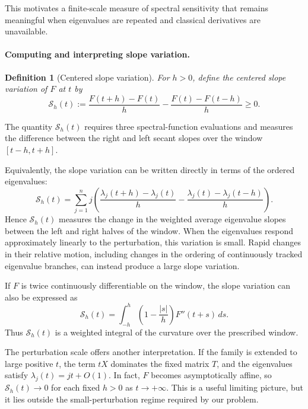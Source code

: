 \documentclass[10pt,a4paper]{article}
\newtheorem{definition}{Definition}[section]
\begin{document}
This motivates a finite-scale measure of spectral
sensitivity that remains meaningful when eigenvalues
are repeated and classical derivatives are unavailable.


\paragraph{Computing and interpreting slope variation.}
\begin{definition}[Centered slope variation]\label{def:defect}
For $h>0$, define the centered slope variation of $F$ at $t$ by
\begin{equation}\label{eq:defect}
\boxed{
\mathcal S_h(t)
:=
\frac{F(t+h)-F(t)}h
-
\frac{F(t)-F(t-h)}h
\geq0.
}
\end{equation}
\end{definition}
The quantity $\mathcal S_h(t)$ requires three
spectral-function evaluations and measures the difference
between the right and left secant slopes over the window
$[t-h,t+h]$.  


Equivalently, the slope variation can be written
directly in terms of the ordered eigenvalues:
\begin{equation}\label{eq:slope-eigenvalues}
\boxed{
\mathcal S_h(t)=\sum_{j=1}^n j
\left(
\frac{\lambda_j(t+h)-\lambda_j(t)}{h}
-\frac{\lambda_j(t)-\lambda_j(t-h)}{h}
\right).
}
\end{equation}
Hence $\mathcal S_h(t)$ measures the change in the
weighted average eigenvalue slopes between the
left and right halves of the window. When the
eigenvalues respond approximately linearly to the
perturbation, this variation is small. Rapid changes
in their relative motion, including changes in the
ordering of continuously tracked eigenvalue branches,
can instead produce a large slope variation.

If $F$ is twice continuously differentiable on the window,
the slope variation can also be expressed as
\begin{equation}\label{eq:slope-curvature}
\boxed{
\mathcal S_h(t)
=
\int_{-h}^{h}
\left(1-\frac{|s|}{h}\right)F''(t+s)\,ds.
}
\end{equation}
Thus $\mathcal S_h(t)$ is a weighted
integral of the curvature over the prescribed window.


The perturbation scale offers another interpretation.
If the family is extended to large positive $t$, the
term $tX$ dominates the fixed matrix $T$, and the
eigenvalues satisfy $\lambda_j(t)=jt+O(1)$.
In fact, $F$ becomes asymptotically affine, so
$\mathcal S_h(t)\to0$ for each fixed $h>0$ as
$t\to+\infty$. This is a useful limiting picture,
but it lies outside the small-perturbation regime
required by our problem.
\end{document}
